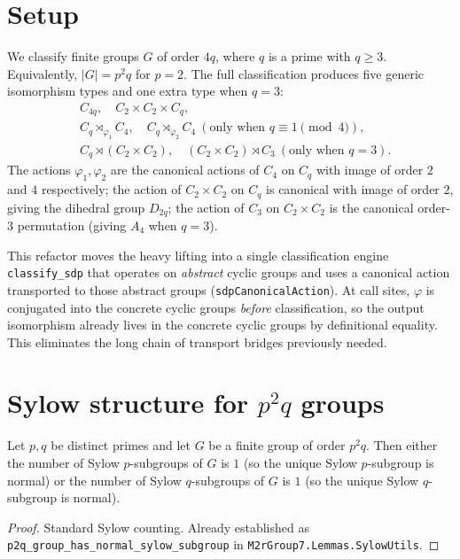


\section{Setup}

We classify finite groups $G$ of order $4q$, where $q$ is a prime with $q \geq
3$. Equivalently, $|G| = p^2 q$ for $p = 2$. The full classification produces
five generic isomorphism types and one extra type when $q = 3$:
\[
\begin{aligned}
& C_{4q}, \quad C_2 \times C_2 \times C_q, \\
& C_q \rtimes_{\varphi_1} C_4, \quad
  C_q \rtimes_{\varphi_2} C_4 \ (\text{only when } q \equiv 1 \pmod 4), \\
& C_q \rtimes (C_2 \times C_2), \quad
  (C_2 \times C_2) \rtimes C_3 \ (\text{only when } q = 3).
\end{aligned}
\]
The actions $\varphi_1, \varphi_2$ are the canonical actions of $C_4$ on $C_q$
with image of order $2$ and $4$ respectively; the action of $C_2 \times C_2$ on
$C_q$ is canonical with image of order $2$, giving the dihedral group
$D_{2q}$; the action of $C_3$ on $C_2 \times C_2$ is the canonical order-$3$
permutation (giving $A_4$ when $q = 3$).

This refactor moves the heavy lifting into a single classification engine
\texttt{classify\_sdp} that operates on \emph{abstract} cyclic groups and uses
a canonical action transported to those abstract groups
(\texttt{sdpCanonicalAction}). At call sites, $\varphi$ is conjugated into the
concrete cyclic groups \emph{before} classification, so the output isomorphism
already lives in the concrete cyclic groups by definitional equality. This
eliminates the long chain of transport bridges previously needed.

\section{Sylow structure for $p^2 q$ groups}

\begin{lemma}
    \label{lem:p2q-normal-sylow}
    Let $p, q$ be distinct primes and let $G$ be a finite group of order
    $p^2 q$. Then either the number of Sylow $p$-subgroups of $G$ is $1$ (so
    the unique Sylow $p$-subgroup is normal) or the number of Sylow
    $q$-subgroups of $G$ is $1$ (so the unique Sylow $q$-subgroup is normal).
\end{lemma}
\begin{proof}
    Standard Sylow counting. Already established as
    \texttt{p2q\_group\_has\_normal\_sylow\_subgroup} in
    \texttt{M2rGroup7.Lemmas.SylowUtils}.
\end{proof}

